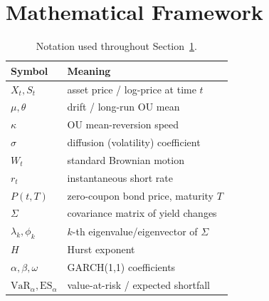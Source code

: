 \documentclass[conference]{IEEEtran}
\begin{document}
\section{Mathematical Framework}
\label{sec:math}

\begin{table}[!t]
\caption{Notation used throughout Section~\ref{sec:math}.}
\label{tab:notation}
\centering\footnotesize
\begin{tabular}{@{}ll@{}}
\toprule
Symbol & Meaning \\
\midrule
$X_t, S_t$      & asset price / log-price at time $t$ \\
$\mu, \theta$   & drift / long-run OU mean \\
$\kappa$        & OU mean-reversion speed \\
$\sigma$        & diffusion (volatility) coefficient \\
$W_t$           & standard Brownian motion \\
$r_t$           & instantaneous short rate \\
$P(t,T)$        & zero-coupon bond price, maturity $T$ \\
$\Sigma$        & covariance matrix of yield changes \\
$\lambda_k, \phi_k$ & $k$-th eigenvalue/eigenvector of $\Sigma$ \\
$H$             & Hurst exponent \\
$\alpha, \beta, \omega$ & GARCH(1,1) coefficients \\
$\text{VaR}_\alpha, \text{ES}_\alpha$ & value-at-risk / expected shortfall \\
\bottomrule
\end{tabular}
\end{table}
\end{document}
